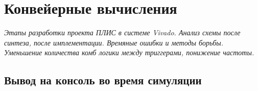 \chapter{Конвейерные вычисления}

\emph{Этапы разработки проекта ПЛИС в системе Vivado. Анализ схемы после синтеза, после имплементации. Времяные ошибки и методы борьбы. Уменьшение количества комб логики между триггерами, понижение частоты.}

\section{Вывод на консоль во время симуляции}
